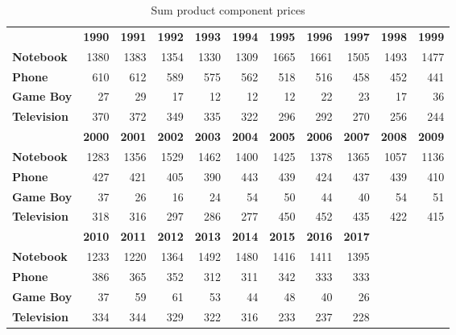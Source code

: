 \begin{table}[ht]
    \centering
    \begin{tabular}{|l|r|r|r|r|r|r|r|r|r|r|}
    \hline
                & \textbf{1990} & \textbf{1991}  & \textbf{1992}  & \textbf{1993}  & \textbf{1994}  & \textbf{1995}  & \textbf{1996}  & \textbf{1997}  & \textbf{1998}  & \textbf{1999}  \\
    \textbf{Notebook}    & 1380  & 1383  & 1354  & 1330  & 1309  & 1665  & 1661  & 1505  & 1493  & 1477  \\   
    \textbf{Phone}       & 610   & 612   & 589   & 575   & 562   & 518   & 516   & 458   & 452   & 441   \\ 
    \textbf{Game Boy}    & 27    & 29    & 17    & 12    & 12    & 12    & 22    & 23    & 17    & 36    \\  
    \textbf{Television}  & 370   & 372   & 349   & 335   & 322   & 296   & 292   & 270   & 256   & 244    \\ 
    \hline       
                & \textbf{2000}  & \textbf{2001}  & \textbf{2002}  & \textbf{2003}  & \textbf{2004}  & \textbf{2005}  & \textbf{2006}  & \textbf{2007}  & \textbf{2008}  & \textbf{2009} \\
    \textbf{Notebook}    & 1283  & 1356  & 1529  & 1462  & 1400  & 1425  & 1378  & 1365  & 1057  & 1136 \\   
    \textbf{Phone}       & 427   & 421   & 405   & 390   & 443   & 439   & 424   & 437   & 439   & 410 \\  
    \textbf{Game Boy}    & 37    & 26    & 16    & 24    & 54    & 50    & 44    & 40    & 54    & 51  \\   
    \textbf{Television}  & 318   & 316   & 297   & 286   & 277   & 450   & 452   & 435   & 422   & 415 \\ 
    \hline
                & \textbf{2010}  & \textbf{2011}  & \textbf{2012}  & \textbf{2013}  & \textbf{2014}  & \textbf{2015}  & \textbf{2016}  & \textbf{2017}  &  &\\
    \textbf{Notebook}    & 1233  & 1220  & 1364  & 1492  & 1480  & 1416  & 1411  & 1395  &  &\\   
    \textbf{Phone}       & 386   & 365   & 352   & 312   & 311   & 342   & 333   & 333   &  &\\ 
    \textbf{Game Boy}    & 37    & 59    & 61    & 53    & 44    & 48    & 40    & 26    & & \\  
    \textbf{Television}  & 334   & 344   & 329   & 322   & 316   & 233   & 237   & 228   &  &\\ 
    \hline
    \end{tabular}
    \caption{Sum product component prices}
    \label{sum_product_component_prices}
\end{table}
 
